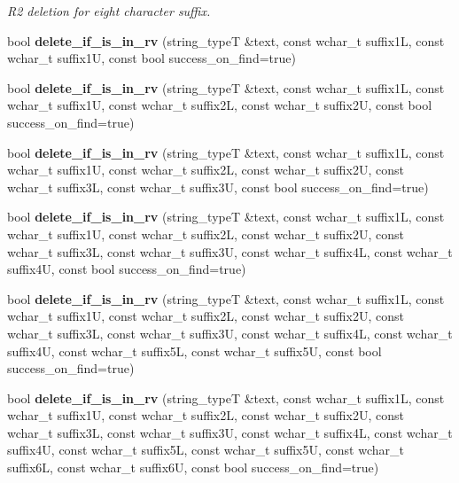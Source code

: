 \begin{DoxyCompactItemize}
\begin{DoxyCompactList}\small\item\em R2 deletion for eight character suffix. \end{DoxyCompactList}\item 
bool {\bfseries delete\+\_\+if\+\_\+is\+\_\+in\+\_\+rv} (string\+\_\+typeT \&text, const wchar\+\_\+t suffix1L, const wchar\+\_\+t suffix1U, const bool success\+\_\+on\+\_\+find=true)\label{classstemming_1_1stem_a3754d998db70ac20861ab3e87c3e5f25}

\item 
bool {\bfseries delete\+\_\+if\+\_\+is\+\_\+in\+\_\+rv} (string\+\_\+typeT \&text, const wchar\+\_\+t suffix1L, const wchar\+\_\+t suffix1U, const wchar\+\_\+t suffix2L, const wchar\+\_\+t suffix2U, const bool success\+\_\+on\+\_\+find=true)\label{classstemming_1_1stem_a5d0a95806d9264f7238bf425311d1dfc}

\item 
bool {\bfseries delete\+\_\+if\+\_\+is\+\_\+in\+\_\+rv} (string\+\_\+typeT \&text, const wchar\+\_\+t suffix1L, const wchar\+\_\+t suffix1U, const wchar\+\_\+t suffix2L, const wchar\+\_\+t suffix2U, const wchar\+\_\+t suffix3L, const wchar\+\_\+t suffix3U, const bool success\+\_\+on\+\_\+find=true)\label{classstemming_1_1stem_a70623a86bd9b759befe998a364d2bad2}

\item 
bool {\bfseries delete\+\_\+if\+\_\+is\+\_\+in\+\_\+rv} (string\+\_\+typeT \&text, const wchar\+\_\+t suffix1L, const wchar\+\_\+t suffix1U, const wchar\+\_\+t suffix2L, const wchar\+\_\+t suffix2U, const wchar\+\_\+t suffix3L, const wchar\+\_\+t suffix3U, const wchar\+\_\+t suffix4L, const wchar\+\_\+t suffix4U, const bool success\+\_\+on\+\_\+find=true)\label{classstemming_1_1stem_aa14e355385422f170a184e1e2182c6b0}

\item 
bool {\bfseries delete\+\_\+if\+\_\+is\+\_\+in\+\_\+rv} (string\+\_\+typeT \&text, const wchar\+\_\+t suffix1L, const wchar\+\_\+t suffix1U, const wchar\+\_\+t suffix2L, const wchar\+\_\+t suffix2U, const wchar\+\_\+t suffix3L, const wchar\+\_\+t suffix3U, const wchar\+\_\+t suffix4L, const wchar\+\_\+t suffix4U, const wchar\+\_\+t suffix5L, const wchar\+\_\+t suffix5U, const bool success\+\_\+on\+\_\+find=true)\label{classstemming_1_1stem_adb10d6f58dca24420ce2b1fd7e58928f}

\item 
bool {\bfseries delete\+\_\+if\+\_\+is\+\_\+in\+\_\+rv} (string\+\_\+typeT \&text, const wchar\+\_\+t suffix1L, const wchar\+\_\+t suffix1U, const wchar\+\_\+t suffix2L, const wchar\+\_\+t suffix2U, const wchar\+\_\+t suffix3L, const wchar\+\_\+t suffix3U, const wchar\+\_\+t suffix4L, const wchar\+\_\+t suffix4U, const wchar\+\_\+t suffix5L, const wchar\+\_\+t suffix5U, const wchar\+\_\+t suffix6L, const wchar\+\_\+t suffix6U, const bool success\+\_\+on\+\_\+find=true)\label{classstemming_1_1stem_a2102feb734da90e80172d1f34102c8cd}


\end{DoxyCompactItemize}
